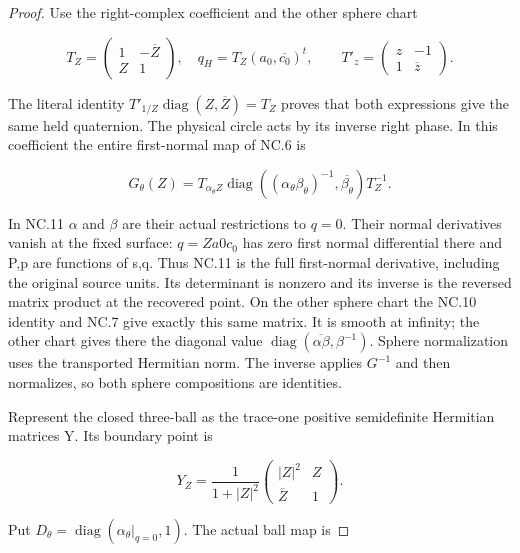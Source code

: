 \begin{proof}
\par\nobreak

Use the right-complex coefficient and the other sphere chart

\[
 T_Z=\begin{pmatrix}1&-\overline Z\\ Z&1\end{pmatrix},\quad
 q_H=T_Z(a_0,\overline{c_0})^t,\qquad
 T'_z=\begin{pmatrix}z&-1\\1&\overline z\end{pmatrix}.
                                                        \tag{NC.10}
\]

The literal identity
\(T'_{1/Z} \operatorname{diag}(Z,\overline{Z})=T_Z\) proves that both expressions give the same
held quaternion. The physical circle acts by its inverse right
phase. In this coefficient the entire first-normal map of NC.6 is

\[
 G_\theta(Z)=T_{\alpha_\theta Z}
 \operatorname{diag}((\alpha_\theta\beta_\theta)^{-1},
                                      \overline{\beta_\theta})
 T_Z^{-1}.                                             \tag{NC.11}
\]

In NC.11 \(\alpha\) and \(\beta\) are their actual restrictions to \(q=0\). Their
normal derivatives vanish at the fixed surface: \(q=Za0c_{0}\) has zero
first normal differential there and P,p are functions of s,q.
Thus NC.11 is the full first-normal derivative, including the
original source units. Its determinant is nonzero and its inverse
is the reversed matrix product at the recovered point. On the other
sphere chart the NC.10 identity and NC.7 give exactly this same
matrix. It is smooth at infinity; the other chart gives there the
diagonal value \(\operatorname{diag}(\overline{\alpha \beta},\beta^{-1})\). Sphere normalization
uses the transported Hermitian norm. The inverse applies \(G^{-1}\) and
then normalizes, so both sphere compositions are identities.

Represent the closed three-ball as the trace-one positive
semidefinite Hermitian matrices Y. Its boundary point is

\[
 Y_Z=\frac1{1+|Z|^2}
       \begin{pmatrix}|Z|^2&Z\\\overline Z&1\end{pmatrix}.
                                                        \tag{NC.12}
\]

Put \(D_\theta=\operatorname{diag}(\alpha_\theta|_{q=0},1)\). The actual ball map is


\end{proof}
